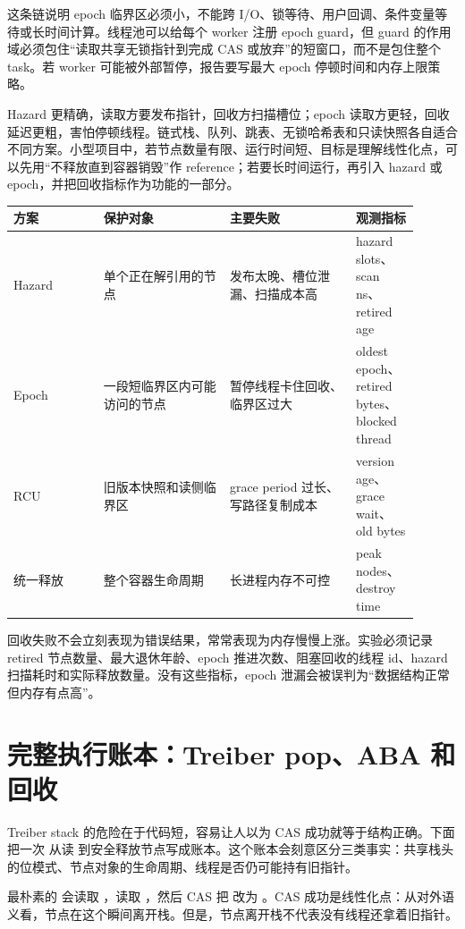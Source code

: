 这条链说明 epoch 临界区必须小，不能跨 I/O、锁等待、用户回调、条件变量等待或长时间计算。线程池可以给每个 worker 注册 epoch guard，但 guard 的作用域必须包住“读取共享无锁指针到完成 CAS 或放弃”的短窗口，而不是包住整个 task。若 worker 可能被外部暂停，报告要写最大 epoch 停顿时间和内存上限策略。

Hazard 更精确，读取方要发布指针，回收方扫描槽位；epoch 读取方更轻，回收延迟更粗，害怕停顿线程。链式栈、队列、跳表、无锁哈希表和只读快照各自适合不同方案。小型项目中，若节点数量有限、运行时间短、目标是理解线性化点，可以先用“不释放直到容器销毁”作 reference；若要长时间运行，再引入 hazard 或 epoch，并把回收指标作为功能的一部分。

\begin{center}
\small
\begin{tabular}{@{}p{0.20\linewidth}p{0.28\linewidth}p{0.28\linewidth}p{0.14\linewidth}@{}}
\toprule
方案 & 保护对象 & 主要失败 & 观测指标 \\
\midrule
Hazard & 单个正在解引用的节点 & 发布太晚、槽位泄漏、扫描成本高 & hazard slots、scan ns、retired age \\
Epoch & 一段短临界区内可能访问的节点 & 暂停线程卡住回收、临界区过大 & oldest epoch、retired bytes、blocked thread \\
RCU & 旧版本快照和读侧临界区 & grace period 过长、写路径复制成本 & version age、grace wait、old bytes \\
统一释放 & 整个容器生命周期 & 长进程内存不可控 & peak nodes、destroy time \\
\bottomrule
\end{tabular}
\end{center}

回收失败不会立刻表现为错误结果，常常表现为内存慢慢上涨。实验必须记录 retired 节点数量、最大退休年龄、epoch 推进次数、阻塞回收的线程 id、hazard 扫描耗时和实际释放数量。没有这些指标，epoch 泄漏会被误判为“数据结构正常但内存有点高”。

\section{完整执行账本：Treiber pop、ABA 和回收}

Treiber stack 的危险在于代码短，容易让人以为 CAS 成功就等于结构正确。下面把一次  从读  到安全释放节点写成账本。这个账本会刻意区分三类事实：共享栈头的位模式、节点对象的生命周期、线程是否仍可能持有旧指针。

最朴素的  会读取 ，读取 ，然后 CAS 把  改为 。CAS 成功是线性化点：从对外语义看，节点在这个瞬间离开栈。但是，节点离开栈不代表没有线程还拿着旧指针。

